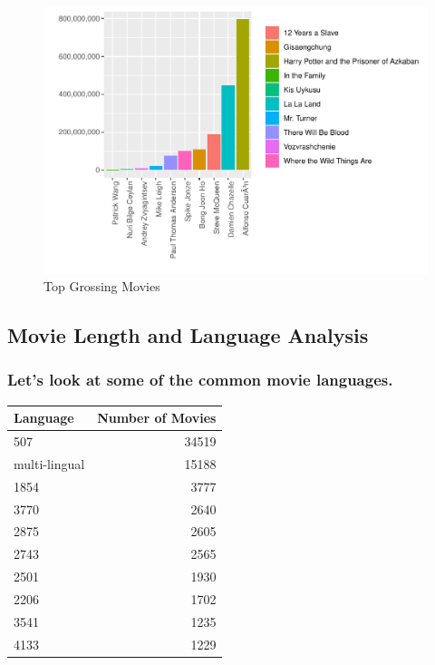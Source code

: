 \documentclass[11pt,a4paper,]{article}
\begin{document}
\begin{figure}

{\centering \includegraphics{Report_files/figure-latex/4-1} 

}

\caption{Top Grossing Movies}\label{fig:4}
\end{figure}

\hypertarget{movie-length-and-language-analysis}{%
\subsection{Movie Length and Language Analysis}\label{movie-length-and-language-analysis}}

\hypertarget{lets-look-at-some-of-the-common-movie-languages.}{%
\subsubsection{Let's look at some of the common movie languages.}\label{lets-look-at-some-of-the-common-movie-languages.}}

\begin{table}[H]
\centering
\begin{tabular}{l|r}
\hline
Language & Number of Movies\\
\hline
507 & 34519\\
\hline
multi-lingual & 15188\\
\hline
1854 & 3777\\
\hline
3770 & 2640\\
\hline
2875 & 2605\\
\hline
2743 & 2565\\
\hline
2501 & 1930\\
\hline
2206 & 1702\\
\hline
3541 & 1235\\
\hline
4133 & 1229\\
\hline
\end{tabular}
\end{table}
\end{document}
